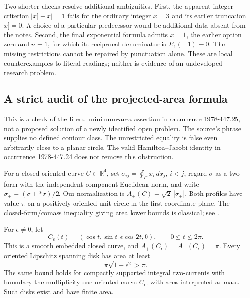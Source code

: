 Two shorter checks resolve additional ambiguities. First, the apparent integer criterion \(|x]-x|=1\) fails for the ordinary integer \(x=3\) and its earlier truncation \(x]=0\). A choice of a particular predecessor would be additional data absent from the notes. Second, the final exponential formula admits \(x=1\), the earlier option zero and \(n=1\), for which its reciprocal denominator is \(E_1(-1)=0\). The missing restrictions cannot be repaired by punctuation alone. These are local counterexamples to literal readings; neither is evidence of an undeveloped research problem.


\subsection{A strict audit of the projected-area formula}

This is a check of the literal minimum-area assertion in occurrence
1978-447.25, not a proposed solution of a newly identified open problem.
The source's phrase  supplies no
defined contour class.  The unrestricted equality is false even arbitrarily
close to a planar circle.  The valid Hamilton--Jacobi identity in occurrence
1978-447.24 does not remove this obstruction.

For a closed oriented curve \(C\subset\mathbb R^4\), set
\(\sigma_{ij}=\oint_C x_i\,dx_j\), \(i<j\), regard \(\sigma\) as a
two-form with the independent-component Euclidean norm, and write
\(\sigma_\pm=(\sigma\pm *\sigma)/2\).  Our normalization is
\(A_\pm(C)=\sqrt2\,|\sigma_\pm|\).  Both profiles have value \(\pi\)
on a positively oriented unit circle in the first coordinate plane.
The closed-form/comass inequality giving area lower bounds is classical;
see \citet[Introduction, pp.~48--49]{harveylawson1982calibrated}.

\begin{proposition}\ours{}
For \(\epsilon\ne0\), let
\[
C_\epsilon(t)=(\cos t,\sin t,\epsilon\cos 2t,0),\qquad 0\le t\le2\pi.
\]
This is a smooth embedded closed curve, and
\(A_+(C_\epsilon)=A_-(C_\epsilon)=\pi\).
Every oriented Lipschitz spanning disk has area at least
\[
\pi\sqrt{1+\epsilon^2}>\pi.
\]
The same bound holds for compactly supported integral two-currents with
boundary the multiplicity-one oriented curve \(C_\epsilon\), with area
interpreted as mass.  Such disks exist and have finite area.
\end{proposition}

